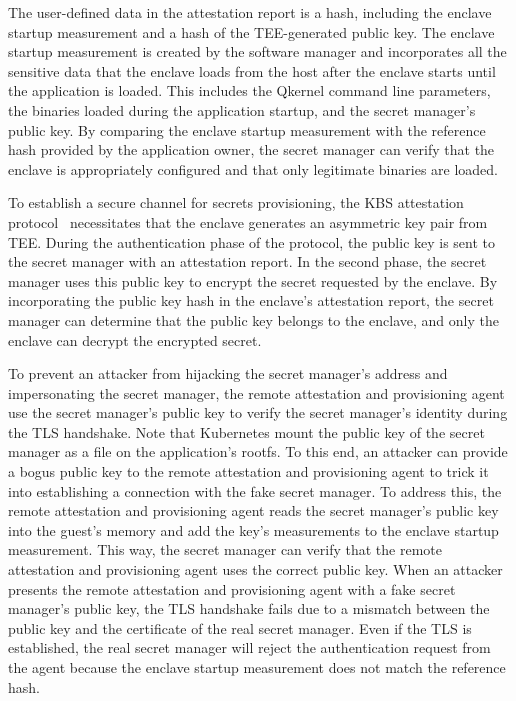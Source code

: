 The user-defined data in the attestation report is a hash, including the enclave startup measurement and a hash of the TEE-generated public key. The enclave startup measurement is created by the software manager and incorporates all the sensitive 
data that the enclave loads from the host after the enclave starts until the application is loaded. This includes the Qkernel command line parameters, the binaries loaded during the application startup, and the secret manager's public key. By 
comparing the enclave startup measurement with the reference hash provided by the application owner, the secret manager can verify that the enclave is appropriately configured and that only legitimate binaries are loaded.

To establish a secure channel for secrets provisioning, the KBS attestation protocol~\cite*{kbs_Attestation_protocol} necessitates that the enclave generates an asymmetric key pair from TEE. During the authentication phase of the protocol, the public key is sent to the secret 
manager with an attestation report. In the second phase, the secret manager uses this public key to encrypt the secret requested by the enclave. By incorporating the public key hash in the enclave's attestation report, the secret manager can 
determine that the public key belongs to the enclave, and only the enclave can decrypt the encrypted secret.

To prevent an attacker from hijacking the secret manager's address and impersonating the secret manager, the remote attestation and provisioning agent use the secret manager's public key to verify the secret manager's identity during the TLS 
handshake. Note that Kubernetes mount the public key of the secret manager as a file on the application's rootfs. To this end, an attacker can provide a bogus public key to the remote attestation and provisioning agent to trick it into establishing 
a connection with the fake secret manager. To address this, the remote attestation and provisioning agent reads the secret manager's public key into the guest's memory and add the key's measurements to the enclave startup measurement. This way, 
the secret manager can verify that the remote attestation and provisioning agent uses the correct public key. When an attacker presents the remote attestation and provisioning agent with a fake secret manager's public key, the TLS handshake fails 
due to a mismatch between the public key and the certificate of the real secret manager. Even if the TLS is established, the real secret manager will reject the authentication request from the agent because the enclave startup measurement does not 
match the reference hash.

